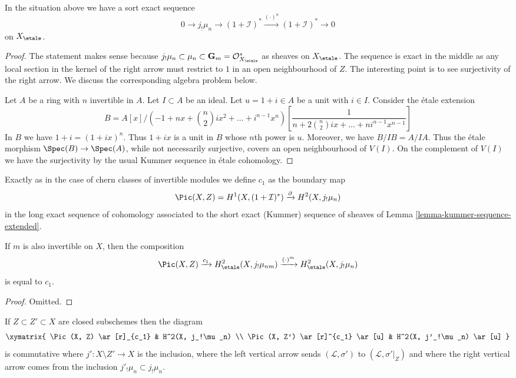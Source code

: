 \begin{lemma}
\label{lemma-kummer-sequence-extended}
In the situation above we have a sort exact sequence
$$
0 \to j_!\mu_n \to (1 + \mathcal{I})^*
\xrightarrow{(\cdot)^n} (1 + \mathcal{I})^* \to 0
$$
on $X_\etale$.
\end{lemma}

\begin{proof}
The statement makes sense because
$j_!\mu_n \subset \mu_n \subset \mathbf{G}_m = \mathcal{O}_{X_\etale}^*$ as
sheaves on $X_\etale$. The sequence is exact in the middle as
any local section in the kernel of the right arrow must restrict
to $1$ in an open neighbourhood of $Z$.
The interesting point is to see surjectivity of the right arrow.
We discuss the corresponding algebra problem below.

\medskip\noindent
Let $A$ be a ring with $n$ invertible in $A$. Let $I \subset A$ be an ideal.
Let $u = 1 + i \in A$ be a unit with $i \in I$.
Consider the \'etale extension
$$
B = A[x]/(-1 + nx + {n \choose 2}ix^2 + \ldots + i^{n - 1}x^n)
\left[\frac{1}{n + 2{n \choose 2}ix + \ldots + ni^{n - 1}x^{n - 1}}\right]
$$
In $B$ we have $1 + i = (1 + ix)^n$. Thus $1 + ix$ is a unit in $B$
whose $n$th power is $u$. Moreover, we have $B/IB = A/IA$.
Thus the \'etale morphism $\Spec(B) \to \Spec(A)$, while not necessarily
surjective, covers an open neighbourhood of $V(I)$. On the complement of $V(I)$
we have the surjectivity by the usual Kummer sequence in \'etale cohomology.
\end{proof}

\noindent
Exactly as in the case of chern classes of invertible modules we
define $c_1$ as the boundary map
$$
\Pic(X, Z) = H^1(X, (1 + \mathcal{I})^*) \xrightarrow{\partial}
H^2(X, j_!\mu_n)
$$
in the long exact sequence of cohomology associated to the short
exact (Kummer) sequence of sheaves of
Lemma \ref{lemma-kummer-sequence-extended}.

\begin{lemma}
\label{lemma-n-m-c1}
If $m$ is also invertible on $X$, then the composition
$$
\Pic(X, Z) \xrightarrow{c_1}
H^2_\etale(X, j_!\mu_{nm}) \xrightarrow{(\cdot)^m}
H^2_\etale(X, j_!\mu_n)
$$
is equal to $c_1$.
\end{lemma}

\begin{proof}
Omitted.
\end{proof}

\begin{lemma}
\label{lemma-restrict-c1}
If $Z \subset Z' \subset X$ are closed subschemes then the diagram
$$
\xymatrix{
\Pic(X, Z) \ar[r]_{c_1} & H^2(X, j_!\mu_n) \\
\Pic(X, Z') \ar[r]^{c_1} \ar[u] & H^2(X, j'_!\mu_n) \ar[u]
}
$$
is commutative where $j' : X \setminus Z' \to X$ is the inclusion,
where the left vertical arrow sends $(\mathcal{L}, \sigma')$
to $(\mathcal{L}, \sigma'|_Z)$ and where the right vertical arrow
comes from the inclusion $j'_!\mu_n \subset j_!\mu_n$.
\end{lemma}

